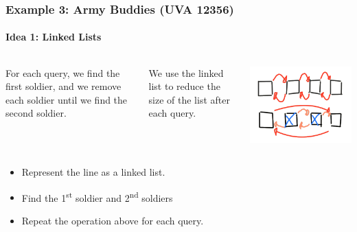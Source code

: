 \begin{frame}
  \frametitle{Example 3: Army Buddies (UVA 12356)}
  \framesubtitle{Idea 1: Linked Lists}

  \begin{columns}
    For each query, we find the first soldier, and we remove each soldier
    until we find the second soldier.\bigskip

    We use the linked list to reduce the size of the list after each query.
    \begin{center}
      \includegraphics[width=.8\textwidth]{img/army-list}
    \end{center}
  \end{columns}

  \begin{itemize}
  \item Represent the line as a linked list.
  \item Find the 1\textsuperscript{st} soldier and 2\textsuperscript{nd} soldiers \hfill {}
  \item Repeat the operation above for each query. \hfill {}
  \end{itemize}
  \bigskip

\end{frame}

